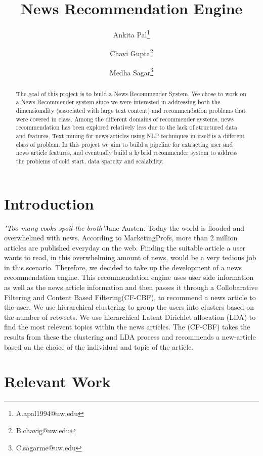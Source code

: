 \documentclass{article}
\title{News Recommendation Engine}
\author[1]{Ankita Pal\thanks{A.apal1994@uw.edu}}
\author[1]{Chavi Gupta\thanks{B.chavig@uw.edu}}
\author[1]{Medha Sagar\thanks{C.sagarme@uw.edu}}
\affil[1]{Department of Data Science, University of Washington}
\begin{document}
\maketitle

\begin{abstract}
    The goal of this project is to build a News Recommender System. We chose to work on a News Recommender system since we were interested in addressing both the dimensionality (associated with large text content) and recommendation problems that were covered in class. Among the different domains of recommender systems, news recommendation has been explored relatively less due to the lack of structured data and features. Text mining for news articles using NLP techniques in itself is a different class of problem. In this project we aim to build a pipeline for extracting user and news article features, and eventually build a hybrid recommender system to address the problems of cold start, data sparcity and scalability. 
\end{abstract}

\section{Introduction}

\textit{"Too many cooks spoil the broth"}\~Jane Austen. Today the world is flooded and overwhelmed with news. According to MarketingProfs, more than 2 million articles are published everyday on the web. Finding the suitable article a user wants to read, in this overwhelming amount of news, would be a very tedious job in this scenario. Therefore, we decided to take up the development of a news recommendation engine. This recommendation engine uses user side information as well as the news article information and then passes it through a Collobarative Filtering and Content Based Filtering(CF-CBF), to recommend a news article to the user. We use hierarchical clustering to group the users into clusters based on the number of retweets. We use hierarchical Latent Dirichlet allocation (LDA) to find the most relevent topics within the news articles. The (CF-CBF) takes the results from these the clustering and LDA process and recommends a new-article based on the choice of the individual and topic of the article.

\section{Relevant Work}
\end{document}
